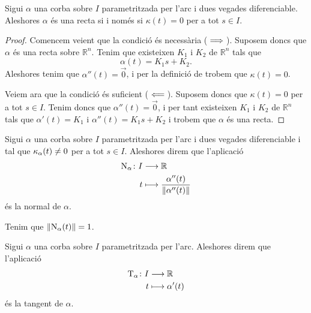 \documentclass[../Apunts.tex]{subfiles}
\begin{document}
	\begin{proposition}
		\label{prop:una corba té curvatura zero si i només si és una recta}
		Sigui \(\alpha\) una corba sobre \(I\) parametritzada per l'arc i dues vegades diferenciable. Aleshores \(\alpha\) és una recta si i només si \(\kappa(t)=0\) per a tot \(s\in I\).
		\begin{proof}
			Comencem veient que la condició és necessària (\(\implies\)). Suposem doncs que \(\alpha\) és una recta sobre \(\mathbb{R}^{n}\). Tenim que existeixen \(K_{1}\) i \(K_{2}\) de \(\mathbb{R}^{n}\) tals que
			\[\alpha(t)=K_{1}s+K_{2}.\]
			Aleshores tenim que \(\alpha''(t)=\vec{0}\), i per la definició de  trobem que \(\kappa(t)=0\).
			
			Veiem ara que la condició és suficient (\(\impliedby\)). Suposem doncs que \(\kappa(t)=0\) per a tot \(s\in I\). Tenim doncs que \(\alpha''(t)=\vec{0}\), i per tant existeixen \(K_{1}\) i \(K_{2}\) de \(\mathbb{R}^{n}\) tals que \(\alpha'(t)=K_{1}\) i \(\alpha''(t)=K_{1}s+K_{2}\) i trobem que \(\alpha\) és una recta.
		\end{proof}
	\end{proposition}
	\begin{definition}[Normal]
		\label{def:normal}
		Sigui \(\alpha\) una corba sobre \(I\) parametritzada per l'arc i dues vegades diferenciable i tal que \(\operatorname{\kappa}_{\alpha}(t)\neq0\) per a tot \(s\in I\). Aleshores direm que l'aplicació
		\begin{align*}
			\normal_{\alpha}\colon I&\longrightarrow\mathbb{R} \\
			t&\longmapsto\frac{\alpha''(t)}{\norm{\alpha''(t)}}
		\end{align*}
		és la normal de \(\alpha\).
	\end{definition}
	\begin{observation}
		\label{obs:la normal a una corba és unitària}
		Tenim que \(\norm{\normal_{\alpha}(t)}=1\).
	\end{observation}
	\begin{definition}[Tangent]
		\label{def:tangent}
		Sigui \(\alpha\) una corba sobre \(I\) parametritzada per l'arc. Aleshores direm que l'aplicació
		\begin{align*}
			\operatorname{T}_{\alpha}\colon I&\longrightarrow\mathbb{R} \\
			t&\longmapsto\alpha'(t)
		\end{align*}
		és la tangent de \(\alpha\).
	\end{definition}
\end{document}
